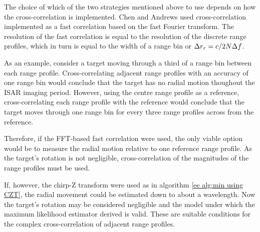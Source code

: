 The choice of which of the two strategies mentioned above to use depends on how the
cross-correlation is implemented.  Chen and Andrews used cross-correlation
implemented as a fast correlation based on the fast Fourier transform.  The
resolution of the fast correlation is equal to the resolution of the
discrete range profiles, which in turn is equal to the width of a range bin
or $\Delta r_r=c/2N{\Delta f}$.  

As an example, consider a target moving through a third of a range bin 
between each range profile.  Cross-correlating adjacent range profiles with
an accuracy of one range bin would conclude that the target has no
radial motion thoughout the ISAR imaging period.  However, using the centre
range profile as a reference, cross-correlating each range profile with the
reference would conclude that the target moves through one range bin for
every three range profiles across from the reference.  

Therefore, if the FFT-based fast correlation were used, the only viable
option would be to measure the radial motion relative to one reference range
profile.  As the target's rotation is not negligible, cross-correlation
of the magnitudes of the range profiles must be used.

If, however, the chirp-Z transform were used as in algorithm \ref{ee
alg:min using CZT}, the radial movement could be estimated down to about a
wavelength.  Now the target's rotation may be considered negligible and the
model under which the maximum likelihood estimator derived is valid.  These
are suitable conditions for the complex cross-correlation of adjacent range
profiles.  

